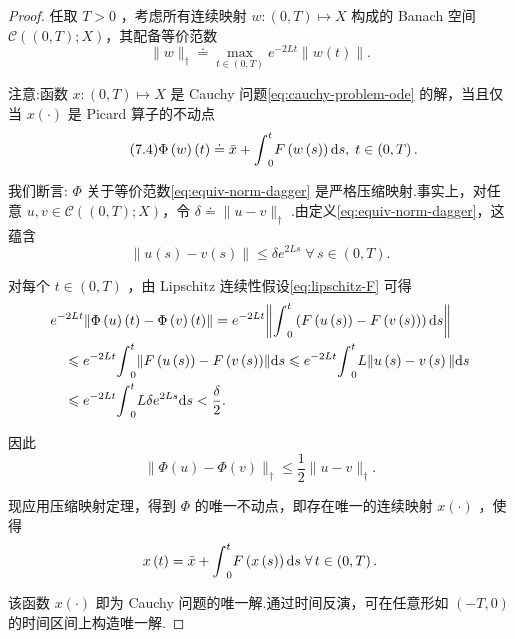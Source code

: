 \begin{proof}
任取 $T > 0$ ，考虑所有连续映射 $w : \left(  {0,T}\right)   \mapsto  X$ 构成的 Banach 空间 $\mathcal{C}\left( {\left(  {0,T}\right)  ;X}\right)$，其配备等价范数
\begin{equation}\tag{7.3}\label{eq:equiv-norm-dagger}
\|w\|_{\dagger} \doteq  \mathop{\max }\limits_{{t \in  \left(  {0,T}\right)  }}{e}^{-{2Lt}}\| w\left( t\right) \| .
\end{equation}

注意:函数 $x : \left(  {0,T}\right)   \mapsto  X$ 是 Cauchy 问题\eqref{eq:cauchy-problem-ode} 的解，当且仅当 $x\left( \cdot \right)$ 是 Picard 算子的不动点
\begin{equation}\tag{7.4}\label{eq:picard-operator}
\Phi \left( w\right) \left( t\right)  \doteq  \bar{x} + {\int }_{0}^{t}F\left( {w\left( s\right) }\right) {\mathop{}\!\mathrm{d} s},\;t \in  \left(  {0,T}\right)  .
\end{equation}

我们断言: $\Phi$ 关于等价范数\eqref{eq:equiv-norm-dagger} 是严格压缩映射.事实上，对任意 $u,v \in  \mathcal{C}\left( {\left(  {0,T}\right)  ;X}\right)$，令 $\delta  \doteq  \|u - v\|_{\dagger}$ .由定义\eqref{eq:equiv-norm-dagger}，这蕴含
\[
\| u\left( s\right)  - v\left( s\right) \|  \leq  \delta {e}^{2Ls}\;\forall\,s \in  \left(  {0,T}\right)  .
\]

对每个 $t \in  \left(  {0,T}\right)$ ，由 Lipschitz 连续性假设\eqref{eq:lipschitz-F} 可得
{\begin{align*}
    &{e}^{-{2Lt}}\norm{\Phi \left( u\right) \left( t\right)  - \Phi \left( v\right) \left( t\right) } = {e}^{-{2Lt}}\norm{{\int }_{0}^{t}\left( {F\left( {u\left( s\right) }\right)  - F\left( {v\left( s\right) }\right) }\right) {\mathop{}\!\mathrm{d} s}}\\
    &\quad \leqslant  {e}^{-{2Lt}}{\int }_{0}^{t}\norm{F\left( {u\left( s\right) }\right)  - F\left( {v\left( s\right) }\right) }{\mathop{}\!\mathrm{d} s} \leqslant  {e}^{-{2Lt}}{\int }_{0}^{t}L\| u\left( s\right)  - v\left( s\right) \| {\mathop{}\!\mathrm{d} s}\\
    &\quad\leqslant  {e}^{-{2Lt}}{\int }_{0}^{t}{L\delta }{e}^{2Ls}{\mathop{}\!\mathrm{d} s} < \frac{\delta }{2}.
\end{align*}}


因此
\begin{equation}\tag{7.5}\label{eq:picard-contraction}
\|\Phi \left( u\right)  - \Phi \left( v\right) \|_{\dagger} \leq  \frac{1}{2}\|u - v\|_{\dagger}.
\end{equation}

现应用压缩映射定理，得到 $\Phi$ 的唯一不动点，即存在唯一的连续映射 $x\left( \cdot \right)$ ，使得
\[
x\left( t\right)  = \bar{x} + {\int }_{0}^{t}F\left( {x\left( s\right) }\right) {\mathop{}\!\mathrm{d} s}\;\forall\,t \in  \left(  {0,T}\right)  .
\]

该函数 $x\left( \cdot \right)$ 即为 Cauchy 问题的唯一解.通过时间反演，可在任意形如 $\left(  {-T,0}\right)$ 的时间区间上构造唯一解.
\end{proof}

